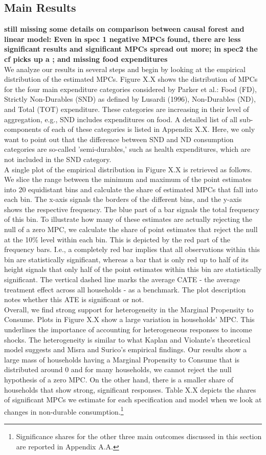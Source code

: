 \subsection{Main Results}
\textbf{still missing some details on comparison between causal forest and linear model: Even in spec 1 negative MPCs found, there are less significant results and significant MPCs spread out more; in spec2 the cf picks up a ; and missing food expenditures} \\
We analyze our results in several steps and begin by looking at the empirical distribution of the estimated MPCs. Figure X.X shows the distribution of MPCs for the four main expenditure categories considered by Parker et al.: Food (FD), Strictly Non-Durables (SND) as defined by Lusardi (1996), Non-Durables (ND), and Total (TOT) expenditure. These categories are increasing in their level of aggregation, e.g., SND includes expenditures on food. A detailed list of all sub-components of each of these categories is listed in Appendix X.X. Here, we only want to point out that the difference between SND and ND consumption categories are so-called 'semi-durables,' such as health expenditures, which are not included in the SND category. \\
A single plot of the empirical distribution in Figure X.X is retrieved as follows. We slice the range between the minimum and maximum of the point estimates into 20 equidistant bins and calculate the share of estimated MPCs that fall into each bin. The x-axis signals the borders of the different bins, and the y-axis shows the respective frequency. The blue part of a bar signals the total frequency of this bin. To illustrate how many of these estimates are actually rejecting the null of a zero MPC, we calculate the share of point estimates that reject the null at the 10\% level within each bin. This is depicted by the red part of the frequency bars. I.e., a completely red bar implies that all observations within this bin are statistically significant, whereas a bar that is only red up to half of its height signals that only half of the point estimates within this bin are statistically significant. The vertical dashed line marks the average CATE - the average treatment effect across all households - as a benchmark. The plot description notes whether this ATE is significant or not. \\ 
Overall, we find strong support for heterogeneity in the Marginal Propensity to Consume. Plots in Figure X.X show a large variation in households' MPC. This underlines the importance of accounting for heterogeneous responses to income shocks. The heterogeneity is similar to what Kaplan and Violante's theoretical model suggests and Misra and Surico's empirical findings. Our results show a large mass of households having a Marginal Propensity to Consume that is distributed around 0 and for many households, we cannot reject the null hypothesis of a zero MPC. On the other hand, there is a smaller share of households that show strong, significant responses. Table X.X depicts the shares of significant MPCs we estimate for each specification and model when we look at changes in non-durable consumption.\footnote{Significance shares for the other three main outcomes discussed in this section are reported in Appendix A.A.} \\
